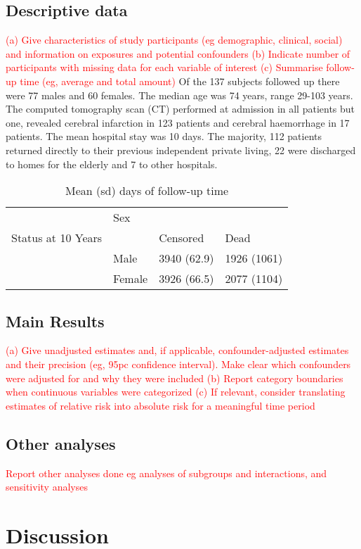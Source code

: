 \documentclass[a4paper,12pt]{article}
\begin{document}
\subsection{Descriptive data} \textcolor{red}{(a) Give characteristics of study participants 
(eg demographic, clinical, social) and information on exposures and potential confounders
(b) Indicate number of participants with missing data for each variable of interest
(c) Summarise follow-up time (eg, average and total amount)} Of the 137 subjects followed up there were 77 males and 60 females. The median age was 74 years, range 29-103 years. The computed tomography scan (CT) performed at admission in all patients but one, revealed cerebral infarction in 123 patients and cerebral haemorrhage in 17 patients. The mean hospital stay was 10 days. The majority, 112 patients returned directly to their previous independent private living, 22 were discharged to homes for the elderly and 7 to other hospitals.
\begin{table}[ht]
\centering
\caption{Mean (sd) days of follow-up time} 
\begin{tabular}{llll}
  \hline
  \hline
 & Sex &  &  \\ 
  Status at 10 Years &  & Censored & Dead \\ 
   & Male & 3940 (62.9) & 1926 (1061) \\ 
   & Female & 3926 (66.5) & 2077 (1104) \\ 
   \hline
\end{tabular}
\end{table}
\subsection{Main Results}\textcolor{red}{
(a) Give unadjusted estimates and, if applicable, confounder-adjusted estimates and
their precision (eg, 95pc confidence interval). Make clear which confounders were
adjusted for and why they were included
(b) Report category boundaries when continuous variables were categorized
(c) If relevant, consider translating estimates of relative risk into absolute risk for a
meaningful time period}
\subsection{Other analyses} \textcolor{red}{Report other analyses done eg analyses of subgroups and interactions, and sensitivity analyses}
\section{Discussion}
\end{document}
